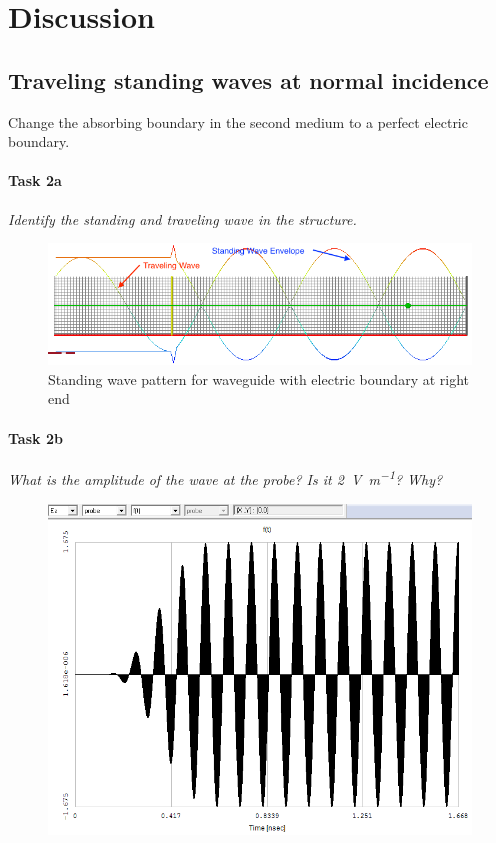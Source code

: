 \section{Discussion}\label{sec:discussion}
\subsection{Traveling standing waves at normal incidence}

Change the absorbing boundary in the second medium to a perfect electric boundary.

\paragraph{Task 2a} \textit{Identify the standing and traveling wave in the structure.}
\begin{figure}[tbph]
	\centering
	\includegraphics[width=0.95\linewidth]{graphics/Task2-2a-Standing-better-envelope}
	\caption{Standing wave pattern for waveguide with electric boundary at right end}
	\label{fig:Task2-2a-Standing-better-envelope}
\end{figure}

\pagebreak
\paragraph{Task 2b} \textit{What is the amplitude of the wave at the probe? Is it \SI{2}{\volt\per\meter}? Why?}
\begin{figure}[tbph]
	\centering
	\includegraphics[width=0.6\linewidth]{graphics/Task2-2b-Amplitude}
\end{figure}

